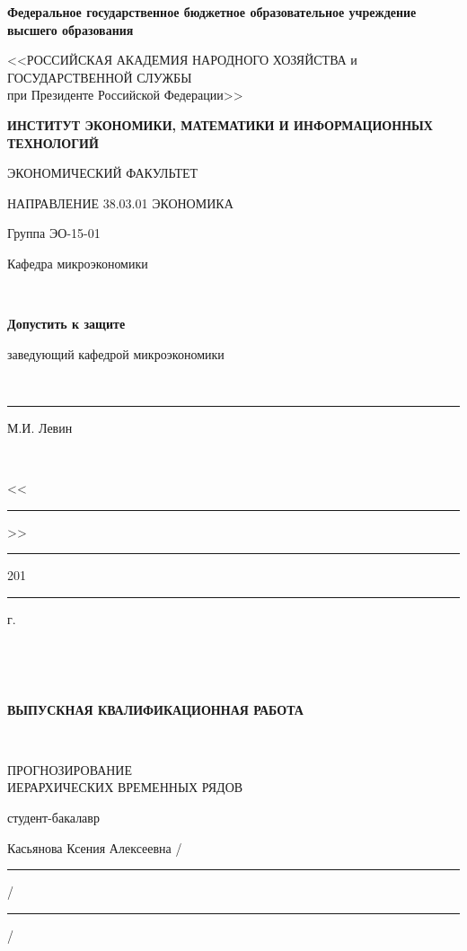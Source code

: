 \documentclass[12pt,a4paper, oneside]{extreport}
\begin{document}

\thispagestyle{empty} %

\begingroup
{}   %
\begin{center}
\small \bfseries Федеральное государственное бюджетное образовательное учреждение высшего образования

<<РОССИЙСКАЯ АКАДЕМИЯ НАРОДНОГО ХОЗЯЙСТВА и\\ ГОСУДАРСТВЕННОЙ СЛУЖБЫ \\
при Президенте Российской Федерации>>

\vspace{2ex}

\bfseries
ИНСТИТУТ ЭКОНОМИКИ, МАТЕМАТИКИ И ИНФОРМАЦИОННЫХ\\ ТЕХНОЛОГИЙ

ЭКОНОМИЧЕСКИЙ ФАКУЛЬТЕТ

НАПРАВЛЕНИЕ 38.03.01 ЭКОНОМИКА
\end{center}

\vfill


\noindent  Группа ЭО-15-01
\hfill
\parbox[t]{20em}{\centering
Кафедра микроэкономики

\mbox{ }

\textbf{Допустить к защите}

заведующий кафедрой микроэкономики

\mbox{ }

\rule{8em}{0.5pt} М.И. Левин

\mbox{ }

<<\rule{2em}{0.5pt}>> \rule{5em}{0.5pt} 201\rule{1em}{0.5pt} г. }

\mbox{ }

\mbox{ }

\begin{center}\bfseries
ВЫПУСКНАЯ КВАЛИФИКАЦИОННАЯ РАБОТА

\mbox{ }

\large
ПРОГНОЗИРОВАНИЕ   \\
ИЕРАРХИЧЕСКИХ ВРЕМЕННЫХ РЯДОВ
\end{center}

\vfill

\noindent\normalsize
студент-бакалавр

\noindent
Касьянова Ксения Алексеевна
\hfill /\rule{6em}{0.5pt}/\rule{6em}{0.5pt}/
\end{document}
